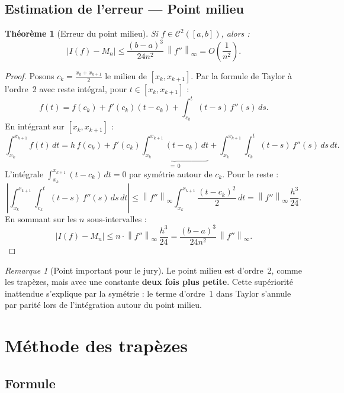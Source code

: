 \documentclass[a4paper,12pt]{article}
\theoremstyle{definition}
\theoremstyle{plain}
\newtheorem{theoreme}{Théorème}[section]
\theoremstyle{remark}
\newtheorem{remarque}{Remarque}[section]
\newcommand{\abs}[1]{\left|#1\right|}
\newcommand{\norme}[1]{\left\|#1\right\|_\infty}
\begin{document}
\subsection{Estimation de l'erreur --- Point milieu}

\begin{theoreme}[Erreur du point milieu]\label{thm:erreur_milieu}
Si $f \in \mathcal{C}^2([a,b])$, alors :
\[
  \abs{I(f) - M_n} \leq \frac{(b-a)^3}{24n^2}\,\norme{f''} = O\!\left(\frac{1}{n^2}\right).
\]
\end{theoreme}

\begin{proof}
Posons $c_k = \frac{x_k + x_{k+1}}{2}$ le milieu de $[x_k, x_{k+1}]$. Par la formule de Taylor à l'ordre~2 avec reste intégral, pour $t \in [x_k, x_{k+1}]$ :
\[
  f(t) = f(c_k) + f'(c_k)(t - c_k) + \int_{c_k}^t (t-s)\,f''(s)\,ds.
\]
En intégrant sur $[x_k, x_{k+1}]$ :
\[
  \int_{x_k}^{x_{k+1}} f(t)\,dt = h\,f(c_k) + f'(c_k)\underbrace{\int_{x_k}^{x_{k+1}}(t-c_k)\,dt}_{=\,0} + \int_{x_k}^{x_{k+1}} \int_{c_k}^t (t-s)\,f''(s)\,ds\,dt.
\]
L'intégrale $\int_{x_k}^{x_{k+1}}(t-c_k)\,dt = 0$ par symétrie autour de $c_k$. Pour le reste :
\[
  \abs{\int_{x_k}^{x_{k+1}} \int_{c_k}^t (t-s)\,f''(s)\,ds\,dt} \leq \norme{f''} \int_{x_k}^{x_{k+1}} \frac{(t-c_k)^2}{2}\,dt = \norme{f''}\,\frac{h^3}{24}.
\]
En sommant sur les $n$ sous-intervalles :
\[
  \abs{I(f) - M_n} \leq n \cdot \norme{f''}\,\frac{h^3}{24} = \frac{(b-a)^3}{24n^2}\,\norme{f''}.
\]
\end{proof}

\begin{remarque}[Point important pour le jury]
Le point milieu est d'ordre~2, comme les trapèzes, mais avec une constante \textbf{deux fois plus petite}. Cette supériorité inattendue s'explique par la symétrie : le terme d'ordre~1 dans Taylor s'annule par parité lors de l'intégration autour du point milieu.
\end{remarque}

\section{Méthode des trapèzes}

\subsection{Formule}
\end{document}
